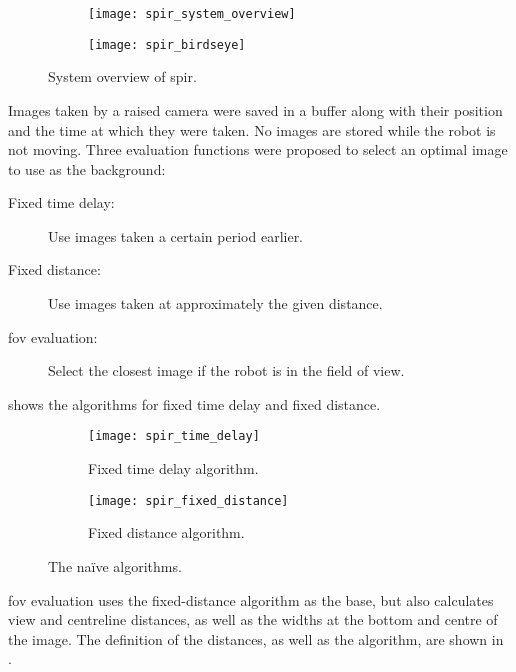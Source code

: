   \begin{figure}[h]
    \centering
    \begin{subfigure}[b]{0.45\textwidth}
      \texttt{[image: spir\_system\_overview]}
    \end{subfigure}
    \hfill
    \begin{subfigure}[b]{0.45\textwidth}
      \texttt{[image: spir\_birdseye]}
    \end{subfigure}
    \caption[\acrshort{spir} system overview]{System overview of \gls{spir}.\cite{shiroma2004}}
    \label{fig:spir_system_overview}
  \end{figure}

  Images taken by a raised camera were saved in a buffer along with their position and the time at which they were taken.
  No images are stored while the robot is not moving.
  Three evaluation functions were proposed to select an optimal image to use as the background:

  \begin{description}
    \item [Fixed time delay:] Use images taken a certain period earlier.
    \item [Fixed distance:] Use images taken at approximately the given distance.
    \item [\Gls{fov} evaluation:] Select the closest image if the robot is in the field of view.
  \end{description}

   shows the algorithms for fixed time delay and fixed distance.

  \begin{figure}[h]
    \centering
    \begin{subfigure}[b]{0.45\textwidth}
      \texttt{[image: spir\_time\_delay]}
      \caption{Fixed time delay algorithm.}
      \label{fig:spir_time_delay}
    \end{subfigure}
    \hfill
    \begin{subfigure}[b]{0.45\textwidth}
      \texttt{[image: spir\_fixed\_distance]}
      \caption{Fixed distance algorithm.}
      \label{fig:spir_fixed_distance}
    \end{subfigure}
    \caption[\acrshort{spir} naïve algorithms]{The naïve algorithms.\cite{shiroma2004}}
    \label{fig:spir_naive_algorithms}
  \end{figure}

  \Gls{fov} evaluation uses the fixed-distance algorithm as the base, but also calculates view and centreline distances, as well as the widths at the bottom and centre of the image.
  The definition of the distances, as well as the algorithm, are shown in .

